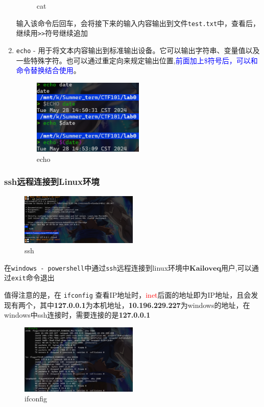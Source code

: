 \documentclass{article}
\begin{document}
\begin{enumerate}
\begin{figure}[H]
                    \caption{cat}
                \end{figure}
                输入该命令后回车，会将接下来的输入内容输出到文件\texttt{test.txt}中，查看后，继续用\texttt{>>}符号继续追加
                \item \texttt{echo} - 用于将文本内容输出到标准输出设备。它可以输出字符串、变量值以及一些特殊字符。也可以通过重定向来规定输出位置,\textcolor{blue}{前面加上\$符号后，可以和命令替换结合使用}。
                \begin{figure}[H]
                    \centering
                    \includegraphics[width=0.5\textwidth]{./figure/echo.png}
                    \caption{echo}
                \end{figure}
            \end{enumerate}
           \subsubsection*{ssh远程连接到Linux环境}
             \begin{figure}[H]
                \centering
                \includegraphics[width=0.5\textwidth]{./figure/ssh.png}
                \caption{ssh}
             \end{figure} 
             在\texttt{windows - powershell}中通过\texttt{ssh}远程连接到linux环境中$\mathbf{Kailoveq}$用户,可以通过\texttt{exit}命令退出 \par 
              值得注意的是，在 \texttt{ifconfig} 查看IP地址时，\textcolor{red}{inet}后面的地址即为IP地址，且会发现有两个，其中\textbf{127.0.0.1}为本机地址，\textbf{10.196.229.227}为windows的地址，在windows中ssh连接时，需要连接的是\textbf{127.0.0.1}
            \begin{figure}[H]
                \centering
                \includegraphics[width=0.5\textwidth]{./figure/ifconfig.png}
                \caption{ifconfig}
            \end{figure}   
\end{document}
